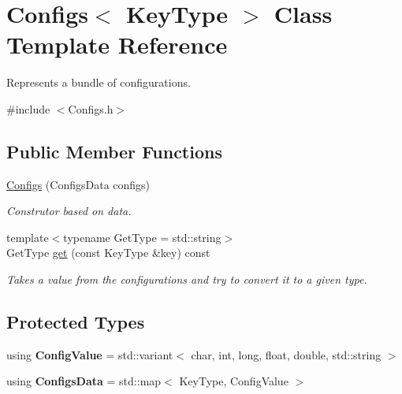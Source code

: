 \hypertarget{class_configs}{}\section{Configs$<$ Key\+Type $>$ Class Template Reference}
\label{class_configs}


Represents a bundle of configurations.  




{\ttfamily \#include $<$Configs.\+h$>$}

\subsection*{Public Member Functions}
\begin{DoxyCompactItemize}
\item 
\mbox{\hyperlink{class_configs_aec48de783d43244d4ecf7c6cd30120c6}{Configs}} (Configs\+Data configs)
\begin{DoxyCompactList}\small\item\em Construtor based on data. \end{DoxyCompactList}\item 
{\footnotesize template$<$typename Get\+Type  = std\+::string$>$ }\\Get\+Type \mbox{\hyperlink{class_configs_a6e7f850ce09a2298daf3634bfc0aba35}{get}} (const Key\+Type \&key) const
\begin{DoxyCompactList}\small\item\em Takes a value from the configurations and try to convert it to a given type. \end{DoxyCompactList}\end{DoxyCompactItemize}
\subsection*{Protected Types}
\begin{DoxyCompactItemize}
\item 
\mbox{\label{class_configs_a488e3df4d36531b3cdca25e65c48575d}} 
using {\bfseries Config\+Value} = std\+::variant$<$ char, int, long, float, double, std\+::string $>$
\item 
\mbox{\label{class_configs_afd64cca5a5b670043325f538d7582d40}} 
using {\bfseries Configs\+Data} = std\+::map$<$ Key\+Type, Config\+Value $>$
\end{DoxyCompactItemize}


